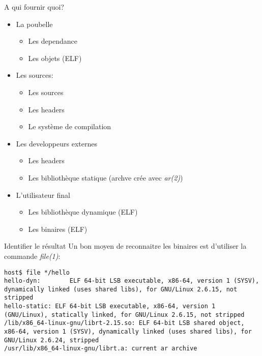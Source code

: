 \begin{frame}[fragile=singleslide]{A qui fournir quoi?}
  \begin{itemize}
  \item La poubelle
    \begin{itemize} 
    \item Les dependance
    \item Les objets (ELF)
    \end{itemize} 
  \item Les sources:
    \begin{itemize} 
    \item Les sources
    \item Les headers
    \item Le système de compilation
    \end{itemize} 
  \item Les developpeurs externes
    \begin{itemize} 
    \item Les headers
    \item Les bibliothèque statique (archve crée avec \emph{ar(2)})
    \end{itemize} 
  \item L'utilisateur final
    \begin{itemize} 
    \item Les bibliothèque dynamique (ELF)
    \item Les binaires (ELF)
    \end{itemize} 
  \end{itemize} 
\end{frame} 

\begin{frame}[fragile=singleslide]{Identifier le résultat}
  Un bon moyen de reconnaitre  les binaires est d'utiliser la commande
  \emph{file(1)}:
  \begin{lstlisting}
host$ file */hello
hello-dyn:        ELF 64-bit LSB executable, x86-64, version 1 (SYSV), dynamically linked (uses shared libs), for GNU/Linux 2.6.15, not stripped
hello-static: ELF 64-bit LSB executable, x86-64, version 1 (GNU/Linux), statically linked, for GNU/Linux 2.6.15, not stripped
/lib/x86_64-linux-gnu/librt-2.15.so: ELF 64-bit LSB shared object, x86-64, version 1 (SYSV), dynamically linked (uses shared libs), for GNU/Linux 2.6.24, stripped
/usr/lib/x86_64-linux-gnu/librt.a: current ar archive
\end{lstlisting} %
\end{frame}

